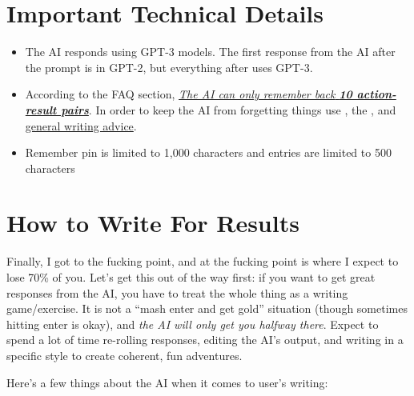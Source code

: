 \documentclass[Avsfag-main.tex]{subfiles}
\begin{document}
\chapter{Important Technical Details}
\label{ch:techinfo}


\begin{itemize}
\item
  The AI responds using GPT-3 models. The first response from the AI after the prompt is in GPT-2, but everything after uses GPT-3.
\item
  According to the FAQ section,
  \href{https://aidungeon.io/frequently-asked-questions/}{\emph{The AI
  can only remember back
  }}\href{https://aidungeon.io/frequently-asked-questions/}{\emph{\textbf{10
  action-result pairs}}}. In order to keep the AI from forgetting things
  use , the , and \hyperref[ch:writing]{general writing advice}.
\item
  Remember pin is limited to 1,000 characters and \wi entries are limited to 500 characters
\end{itemize}

\chapter{How to Write For Results}
\label{ch:writing}

Finally, I got to the fucking point, and at the fucking point is where I expect to lose 70\% of you.
Let's get this out of the way first: if you want to get great responses from the AI, you have to treat the whole thing as a writing game/exercise.
It is not a ``mash enter and get gold'' situation (though sometimes hitting enter is okay), and \emph{the AI will only get you halfway there}.
Expect to spend a lot of time re-rolling responses, editing the AI's output, and writing in a specific style to create coherent, fun adventures.

Here's a few things about the AI when it comes to user's writing:
\end{document}
